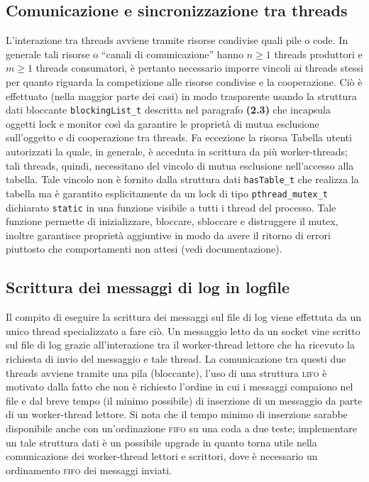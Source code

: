\documentclass[a4paper,10pt]{article}
\begin{document}
\subsection{Comunicazione e sincronizzazione tra threads}
L'interazione tra threads avviene tramite risorse condivise quali pile
o code. In generale tali risorse o ``canali di comunicazione'' hanno
\begin{math} n \geq 1 \end{math} threads produttori e \begin{math} m
  \geq 1 \end{math} threads consumatori, \`e pertanto necessario
imporre vincoli ai threads stessi per quanto riguarda la competizione
alle risorse condivise e la cooperazione. Ci\`o \`e effettuato (nella
maggior parte dei casi) in modo trasparente usando la struttura dati
bloccante \texttt{blockingList\_t} descritta nel paragrafo
\textbf{(2.3)} che incapsula oggetti lock e monitor cos\`i da
garantire le propriet\`a di mutua esclusione sull'oggetto e di
cooperazione tra threads. Fa eccezione la risorsa Tabella utenti
autorizzati la quale, in generale, \`e acceduta in scrittura da pi\`u
worker-threads; tali threads, quindi, necessitano del vincolo di mutua
esclusione nell'accesso alla tabella. Tale vincolo non \`e fornito
dalla struttura dati \texttt{hasTable\_t} che realizza la tabella ma
\`e garantito esplicitamente da un lock di tipo
\texttt{pthread\_mutex\_t} dichiarato \texttt{static} in una funzione
visibile a tutti i thread del processo. Tale funzione permette di
inizializzare, bloccare, sbloccare e distruggere il mutex, inoltre
garantisce propriet\`a aggiuntive in modo da avere il ritorno di
errori piuttosto che comportamenti non attesi (vedi documentazione).

\subsection{Scrittura dei messaggi di log in logfile}
Il compito di eseguire la scrittura dei messaggi sul file di log viene
effettuta da un unico thread specializzato a fare ci\`o. Un messaggio
letto da un socket vine scritto sul file di log grazie all'interazione
tra il worker-thread lettore che ha ricevuto la richiesta di invio del
messaggio e tale thread. La comunicazione tra questi due threads
avviene tramite una pila (bloccante), l'uso di una struttura
\textsc{lifo} \`e motivato dalla fatto che non \`e richiesto l'ordine
in cui i messaggi compaiono nel file e dal breve tempo (il minimo
possibile) di inserzione di un messaggio da parte di un worker-thread
lettore. Si nota che il tempo minimo di inserzione sarabbe disponibile
anche con un'ordinazione \textsc{fifo} su una coda a due teste;
implementare un tale struttura dati \`e un possibile upgrade in quanto
torna utile nella comunicazione dei worker-thread lettori e scrittori,
dove \`e necessario un ordinamento \textsc{fifo} dei messaggi inviati.
\end{document}
